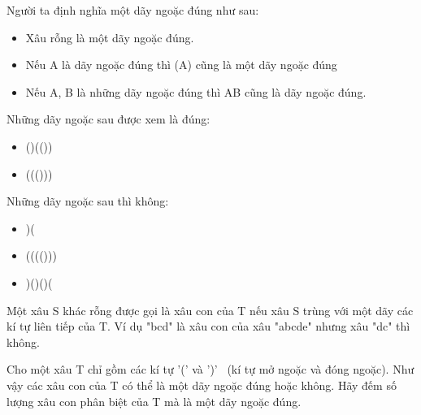 Người ta định nghĩa một dãy ngoặc đúng như sau:  
\begin{itemize}
	\item     Xâu rỗng là một dãy ngoặc đúng.   
	\item     Nếu A là dãy ngoặc đúng thì (A) cũng là một dãy ngoặc đúng   
	\item     Nếu A, B là những dãy ngoặc đúng thì AB cũng là dãy ngoặc đúng.   
\end{itemize}

   Những dãy ngoặc sau được xem là đúng:  
\begin{itemize}
	\item     ()(())   
	\item     ((()))   
\end{itemize}

   Những dãy ngoặc sau thì không:  
\begin{itemize}
	\item     )(   
	\item     (((()))   
	\item     )()()(   
\end{itemize}

   Một xâu S khác rỗng được gọi là xâu con của T nếu xâu S trùng với một dãy các kí tự liên tiếp của T. Ví dụ "bcd" là xâu con của xâu "abcde" nhưng xâu "dc" thì không.  

   Cho một xâu T chỉ gồm các kí tự '(' và ')'  (kí tự mở ngoặc và đóng ngoặc). Như vậy các xâu con của T có thể là một dãy ngoặc đúng hoặc không. Hãy đếm số lượng xâu con phân biệt của T mà là một dãy ngoặc đúng.